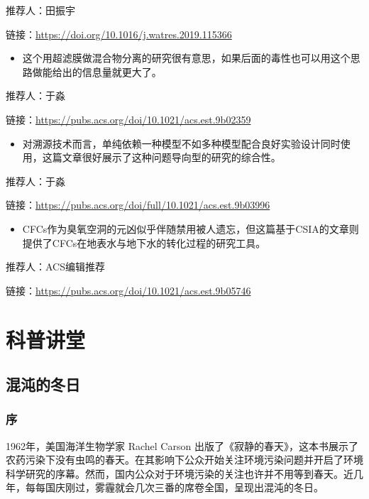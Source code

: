\documentclass[]{book}
\providecommand{\tightlist}{%
  \setlength{\itemsep}{0pt}\setlength{\parskip}{0pt}}
\begin{document}
推荐人：田振宇

链接：\url{https://doi.org/10.1016/j.watres.2019.115366}

\begin{itemize}
\tightlist
\item
  这个用超滤膜做混合物分离的研究很有意思，如果后面的毒性也可以用这个思路做能给出的信息量就更大了。
\end{itemize}

推荐人：于淼

链接：\url{https://pubs.acs.org/doi/10.1021/acs.est.9b02359}

\begin{itemize}
\tightlist
\item
  对溯源技术而言，单纯依赖一种模型不如多种模型配合良好实验设计同时使用，这篇文章很好展示了这种问题导向型的研究的综合性。
\end{itemize}

推荐人：于淼

链接：\url{https://pubs.acs.org/doi/full/10.1021/acs.est.9b03996}

\begin{itemize}
\tightlist
\item
  CFCs作为臭氧空洞的元凶似乎伴随禁用被人遗忘，但这篇基于CSIA的文章则提供了CFCs在地表水与地下水的转化过程的研究工具。
\end{itemize}

推荐人：ACS编辑推荐

链接：\url{https://pubs.acs.org/doi/10.1021/acs.est.9b05746}

\hypertarget{ux79d1ux666eux8bb2ux5802}{%
\chapter{科普讲堂}\label{ux79d1ux666eux8bb2ux5802}}

\hypertarget{ux6df7ux6c8cux7684ux51acux65e5}{%
\section{混沌的冬日}\label{ux6df7ux6c8cux7684ux51acux65e5}}

\hypertarget{ux5e8f}{%
\subsection{序}\label{ux5e8f}}

1962年，美国海洋生物学家 Rachel Carson 出版了《寂静的春天》，这本书展示了农药污染下没有虫鸣的春天。在其影响下公众开始关注环境污染问题并开启了环境科学研究的序幕。然而，国内公众对于环境污染的关注也许并不用等到春天。近几年，每每国庆刚过，雾霾就会几次三番的席卷全国，呈现出混沌的冬日。
\end{document}

